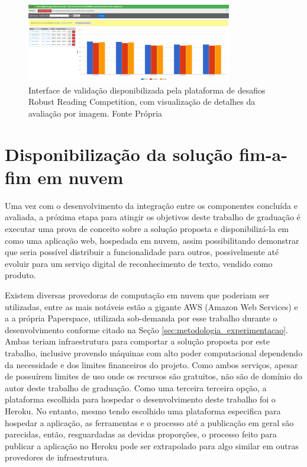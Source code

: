 \begin{figure}
    \centering
    \includegraphics[width=0.8\textwidth]{figs/metodologia-interface-validacao.png}
    \caption{Interface de validação disponibilizada pela plataforma de desafios Robust Reading Competition, com visualização de detalhes da avaliação por imagem. Fonte Própria}
    \label{fig:methodology_validation_interface_details}
\end{figure}

\section{Disponibilização da solução fim-a-fim em nuvem}\label{sec:methodology_cloud_deploy}
Uma vez com o desenvolvimento da integração entre os componentes concluída e avaliada, a próxima etapa para atingir os objetivos deste trabalho de graduação é executar uma prova de conceito sobre a solução proposta e disponibilizá-la em como uma aplicação web, hospedada em nuvem, assim possibilitando demonstrar que seria possível distribuir a funcionalidade para outros, possivelmente até evoluir para um serviço digital de reconhecimento de texto, vendido como produto.

Existem diversas provedoras de computação em nuvem que poderiam ser utilizadas, entre as mais notáveis estão a gigante AWS (Amazon Web Services) e a a própria Paperspace, utilizada sob-demanda por esse trabalho durante o desenvolvimento conforme citado na Seção \ref{sec:metodologia_experimentacao}. Ambas teriam infraestrutura para comportar a solução proposta por este trabalho, inclusive provendo máquinas com alto poder computacional dependendo da necessidade e dos limites financeiros do projeto. Como ambos serviços, apesar de possuírem limites de uso onde os recursos são gratuitos, não são de domínio do autor deste trabalho de graduação. Como uma terceira terceira opção, a plataforma escolhida para hospedar o desenvolvimento deste trabalho foi o Heroku. No entanto, mesmo tendo escolhido uma plataforma especifica para hospedar a aplicação, as ferramentas e o processo até a publicação em geral são parecidas, então, resguardadas as devidas proporções, o processo feito para publicar a aplicação no Heroku pode ser extrapolado para algo similar em outras provedores de infraestrutura.

